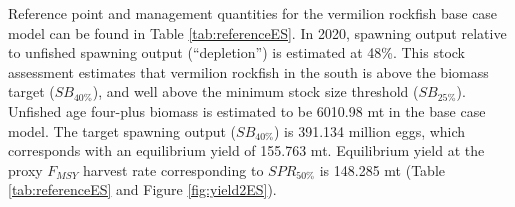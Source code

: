 \documentclass[11pt,
  english,
  a4paper,
]{article}
\begin{document}
Reference point and management quantities for the vermilion rockfish base case model can be found in Table \ref{tab:referenceES}. In 2020, spawning output relative to unfished spawning output (``depletion'') is estimated at 48\%. This stock assessment estimates that vermilion rockfish in the south is above the biomass target ({\(SB_{40\%}\)\leavevmode\tagmcend\tagstructend}), and well above the minimum stock size threshold ({\(SB_{25\%}\)\leavevmode\tagmcend\tagstructend}). Unfished age four-plus biomass is estimated to be 6010.98 mt in the base case model. The target spawning output ({\(SB_{40\%}\)\leavevmode\tagmcend\tagstructend}) is 391.134 million eggs, which corresponds with an equilibrium yield of 155.763 mt. Equilibrium yield at the proxy {\(F_{MSY}\)\leavevmode\tagmcend\tagstructend} harvest rate corresponding to {\(SPR_{50\%}\)\leavevmode\tagmcend\tagstructend} is 148.285 mt (Table \ref{tab:referenceES} and Figure \ref{fig:yield2ES}).
\end{document}
